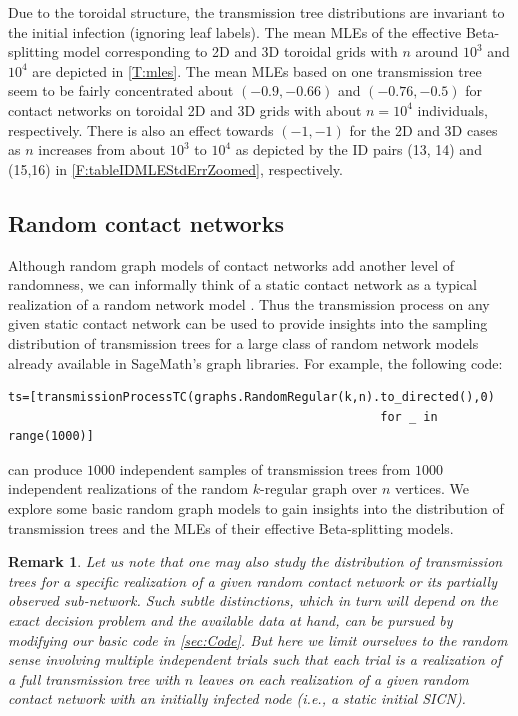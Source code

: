 \documentclass[review]{elsarticle}
\numberwithin{equation}{section}
\let\orgautoref\autoref
\renewcommand{\autoref}
        {\def\equationautorefname{Eq.}%
         \def\figureautorefname{Fig.}%
         \def\subfigureautorefname{Fig.}%
         \def\sectionautorefname{Sect.}%
         \def\subsectionautorefname{Sect.}%
         \def\subsubsectionautorefname{Sect.}%
         \def\Itemautorefname{item}%
         \def\tableautorefname{Table}%
         \def\propositionautorefname{Prop.}%
         \def\corollaryautorefname{Corollary}%
         \def\theoremautorefname{Theorem}%
         \def\remarkautorefname{Remark}%
         \def\lemmaautorefname{Lemma}%
         \def\proofofautorefname{Proof}%
         \def\exampleautorefname{Example}%
         \orgautoref}
\newtheorem{remark}{Remark}%
\begin{document}
Due to the toroidal structure, the transmission tree distributions are invariant to the initial infection (ignoring leaf labels).  
The mean MLEs of the effective Beta-splitting model corresponding to 2D and 3D toroidal grids with $n$ around $10^3$ and $10^4$ are depicted in \autoref{T:mles}.
The mean MLEs based on one transmission tree seem to be fairly concentrated about $(-0.9,-0.66)$ and $(-0.76,-0.5)$ for contact networks on toroidal 2D and 3D grids with about $n=10^4$ individuals, respectively.  
There is also an effect towards $(-1,-1)$ for the 2D and 3D cases as $n$ increases from about $10^3$ to $10^4$ as depicted by the ID pairs (13, 14) and (15,16) in \autoref{F:tableIDMLEStdErrZoomed}, respectively.

\subsection{Random contact networks}\label{S:RandomContactNetworks}

Although random graph models of contact networks add another level of randomness, 
we can informally think of a static contact network as a typical realization of a random network model \citep[Sec.~2.5]{AldousIPSSSD2013}.  
Thus the transmission process on any given static contact network can be used to provide insights into the sampling distribution of transmission trees for a large class of random network models already available in SageMath's graph libraries.
For example, the following code:

{\small
\begin{verbatim}
ts=[transmissionProcessTC(graphs.RandomRegular(k,n).to_directed(),0) 
                                                    for _ in range(1000)]
\end{verbatim}
}
\noindent
can produce $1000$ independent samples of transmission trees from $1000$ independent realizations of the random $k$-regular graph over $n$ vertices. 
We explore some basic random graph models to gain insights into the distribution of transmission trees and the MLEs of their effective Beta-splitting models.  

\begin{remark}
Let us note that one may also study the distribution of transmission trees for a specific realization of a given random contact network or its partially observed sub-network.  
Such subtle distinctions, which in turn will depend on the exact decision problem and the available data at hand, can be pursued by modifying our basic code in \autoref{sec:Code}.  
But here we limit ourselves to the random sense involving multiple independent trials such that each trial is a realization of a full transmission tree with $n$ leaves on each realization of a given random contact network with an initially infected node (i.e., a static initial SICN). 
\end{remark}
 
\end{document}

